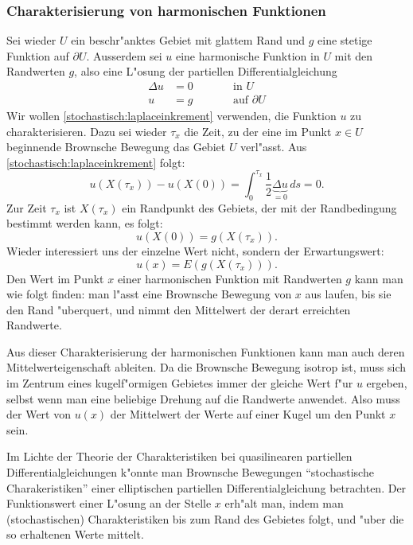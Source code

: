 \subsubsection{Charakterisierung von harmonischen Funktionen}
Sei wieder $U$ ein beschr"anktes Gebiet mit glattem Rand und
$g$ eine stetige Funktion auf $\partial U$.
Ausserdem sei $u$ eine harmonische Funktion in $U$ mit den Randwerten $g$, 
also eine L"osung der partiellen Differentialgleichung
\begin{equation}
\begin{aligned}
\Delta u&=0&\qquad&\text{in $U$}\\
       u&=g&      &\text{auf $\partial U$}
\end{aligned}
\label{stochastisch:harmonisch}
\end{equation}
Wir wollen \eqref{stochastisch:laplaceinkrement} verwenden, die Funktion
$u$ zu charakterisieren.
Dazu sei wieder $\tau_x$ die Zeit, zu der eine im Punkt $x\in U$ beginnende
Brownsche Bewegung das Gebiet $U$ verl"asst.
Aus \eqref{stochastisch:laplaceinkrement} folgt:
\[
u(X(\tau_x))-u(X(0))
=
\int_0^{\tau_x} \frac12\underbrace{\Delta u}_{\textstyle=0}\,ds=0.
\]
Zur Zeit $\tau_x$ ist $X(\tau_x)$ ein Randpunkt des Gebiets, der mit
der Randbedingung bestimmt werden kann, es folgt:
\[
u(X(0)) = g(X(\tau_x)).
\]
Wieder interessiert uns der einzelne Wert nicht, sondern der Erwartungswert:
\[
u(x)=E(g(X(\tau_x))).
\]
Den Wert im Punkt $x$ einer harmonischen Funktion mit Randwerten $g$
kann man wie folgt finden: man l"asst eine Brownsche Bewegung von $x$ 
aus laufen, bis sie den Rand "uberquert, und nimmt den Mittelwert
der derart erreichten Randwerte.

Aus dieser Charakterisierung der harmonischen Funktionen kann man
%
auch deren Mittelwerteigenschaft ableiten. 
%
Da die Brownsche Bewegung isotrop ist, muss sich im Zentrum
%
eines kugelf"ormigen Gebietes immer der gleiche Wert f"ur $u$
ergeben, selbst wenn man eine beliebige Drehung auf die Randwerte 
anwendet.
Also muss der Wert von $u(x)$ der Mittelwert der Werte
auf einer Kugel um den Punkt $x$ sein.

Im Lichte der Theorie der Charakteristiken bei quasilinearen partiellen
Differentialgleichungen k"onnte man Brownsche Bewegungen ``stochastische
Charakeristiken'' einer elliptischen partiellen Differentialgleichung
betrachten.
Der Funktionswert einer L"osung an der Stelle $x$ erh"alt man, indem
man (stochastischen) Charakteristiken bis zum Rand des Gebietes
folgt, und "uber die so erhaltenen Werte mittelt.







